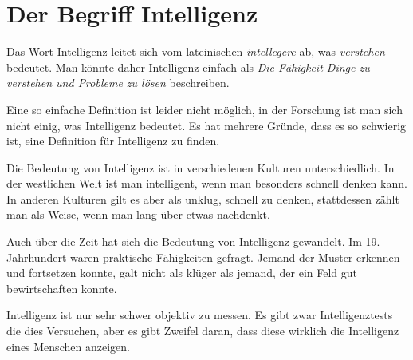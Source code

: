 \chapter{Der Begriff Intelligenz}

Das Wort Intelligenz leitet sich vom lateinischen \emph{intellegere} ab, was \emph{verstehen} bedeutet. Man könnte daher Intelligenz einfach als \emph{Die Fähigkeit Dinge zu verstehen und Probleme zu lösen} beschreiben.

Eine so einfache Definition ist leider nicht möglich, in der Forschung ist man sich nicht einig, was Intelligenz bedeutet. Es hat mehrere Gründe, dass es so schwierig ist, eine Definition für Intelligenz zu finden.

Die Bedeutung von Intelligenz ist in verschiedenen Kulturen unterschiedlich. In der westlichen Welt ist man intelligent, wenn man besonders schnell denken kann. In anderen Kulturen gilt es aber als unklug, schnell zu denken, stattdessen zählt man als Weise, wenn man lang über etwas nachdenkt.

Auch über die Zeit hat sich die Bedeutung von Intelligenz gewandelt. Im 19. Jahrhundert waren praktische Fähigkeiten gefragt. Jemand der Muster erkennen und fortsetzen konnte, galt nicht als klüger als jemand, der ein Feld gut bewirtschaften konnte.

Intelligenz ist nur sehr schwer objektiv zu messen. Es gibt zwar Intelligenztests die dies Versuchen, aber es gibt Zweifel daran, dass diese wirklich die Intelligenz eines Menschen anzeigen.
